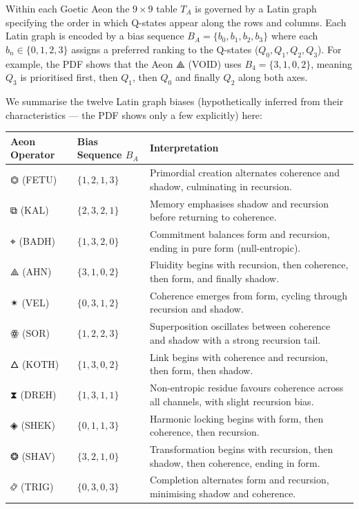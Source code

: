 \documentclass[11pt, letterpaper]{article}
\begin{document}
Within each Goetic Aeon the $9 \times 9$ table $T_A$ is governed by a Latin graph specifying the order in which Q-states appear along the rows and columns. Each Latin graph is encoded by a bias sequence $B_A = \{b_0, b_1, b_2, b_3\}$ where each $b_n \in \{0,1,2,3\}$ assigns a preferred ranking to the Q-states ($Q_0, Q_1, Q_2, Q_3$). For example, the PDF shows that the Aeon \ensuremath{\mathbin{⟁}} (VOID) uses $B_4 = \{3,1,0,2\}$, meaning $Q_3$ is prioritised first, then $Q_1$, then $Q_0$ and finally $Q_2$ along both axes.

We summarise the twelve Latin graph biases (hypothetically inferred from their characteristics --- the PDF shows only a few explicitly) here:

\begin{center}
\begin{longtable}{p{} p{} p{}}
\toprule
\textbf{Aeon Operator} & \textbf{Bias Sequence $B_A$} & \textbf{Interpretation} \tabularnewline
\midrule
\ensuremath{\mathbin{⏣}} (FETU) & $\{1,2,1,3\}$ & Primordial creation alternates coherence and shadow, culminating in recursion. \tabularnewline
\midrule
\ensuremath{\mathbin{⧉}} (KAL) & $\{2,3,2,1\}$ & Memory emphasises shadow and recursion before returning to coherence. \tabularnewline
\midrule
\ensuremath{\mathbin{⌖}} (BADH) & $\{1,3,2,0\}$ & Commitment balances form and recursion, ending in pure form (null-entropic). \tabularnewline
\midrule
\ensuremath{\mathbin{⟁}} (AHN) & $\{3,1,0,2\}$ & Fluidity begins with recursion, then coherence, then form, and finally shadow. \tabularnewline
\midrule
\ensuremath{\mathbin{✴}} (VEL) & $\{0,3,1,2\}$ & Coherence emerges from form, cycling through recursion and shadow. \tabularnewline
\midrule
\ensuremath{\mathbin{ꙮ}} (SOR) & $\{1,2,2,3\}$ & Superposition oscillates between coherence and shadow with a strong recursion tail. \tabularnewline
\midrule
\ensuremath{\mathbin{🜂}} (KOTH) & $\{1,3,0,2\}$ & Link begins with coherence and recursion, then form, then shadow. \tabularnewline
\midrule
\ensuremath{\mathbin{⧗}} (DREH) & $\{1,3,1,1\}$ & Non-entropic residue favours coherence across all channels, with slight recursion bias. \tabularnewline
\midrule
\ensuremath{\mathbin{◈}} (SHEK) & $\{0,1,1,3\}$ & Harmonic locking begins with form, then coherence, then recursion. \tabularnewline
\midrule
\ensuremath{\mathbin{❂}} (SHAV) & $\{3,2,1,0\}$ & Transformation begins with recursion, then shadow, then coherence, ending in form. \tabularnewline
\midrule
\ensuremath{\mathbin{࿂}} (TRIG) & $\{0,3,0,3\}$ & Completion alternates form and recursion, minimising shadow and coherence. \tabularnewline
\bottomrule
\end{longtable}
\end{center}
\end{document}
